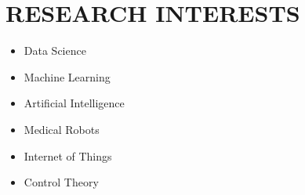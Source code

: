 \documentclass[10pt,a4paper,sans]{moderncv} %
\begin{document}
	\makecvtitle
	\vspace{-2.5 em}
	\section{RESEARCH INTERESTS}
        \begin{multicols}{3}
            \begin{itemize}
                \centering
                \item Data Science
                \item Machine Learning
                \item Artificial Intelligence
                \item Medical Robots
                \item Internet of Things
                \item Control Theory
            \end{itemize}
        \end{multicols}
\end{document}
